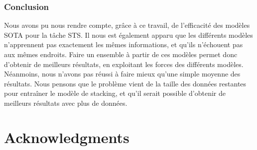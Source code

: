 \documentclass[11pt,a4paper, french]{article}
\begin{document}
\subsubsection{Conclusion}

Nous avons pu nous rendre compte, grâce à ce travail, de l'efficacité des modèles SOTA pour la tâche STS. Il nous est également apparu que les différents modèles n'apprennent pas exactement les mêmes informations, et qu'ils n'échouent pas aux mêmes endroits. Faire un ensemble à partir de ces modèles permet donc d'obtenir de meilleurs résultats, en exploitant les forces des différents modèles. Néanmoins, nous n'avons pas réussi à faire mieux qu'une simple moyenne des résultats. Nous pensons que le problème vient de la taille des données restantes pour entraîner le modèle de stacking, et qu'il serait possible d'obtenir de meilleurs résultats avec plus de données.

\section*{Acknowledgments}
 




\appendix
\end{document}
